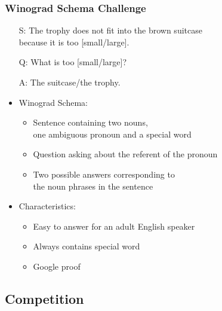\documentclass[c,8pt,xcolor...,x11names]{beamer}
\begin{document}
\begin{frame}
\frametitle{Winograd Schema Challenge}
	\begin{itemize}
	\small
	\item[S:] The trophy does not fit into the brown suitcase\\ because \alert{it} is too \alert{[small/large]}.
	\item[Q:] What is too [small/large]?
	\item[A:] The suitcase/the trophy.
\end{itemize} 
\begin{itemize}
	\item Winograd Schema: 
	\begin{itemize}
		\normalsize
		\item Sentence containing two nouns, \\one ambiguous \alert{pronoun} and a special word
		\item Question asking about the referent of the pronoun
		\item Two possible answers corresponding to\\ the noun phrases in the sentence
	\end{itemize}
		 \item Characteristics:
		  \begin{itemize}
		\normalsize
		\item Easy to answer for an adult English speaker
		\item Always contains \alert{special word}
		\item Google proof
	\end{itemize}
\end{itemize}
\end{frame}

\subsection{Competition}
\end{document}
